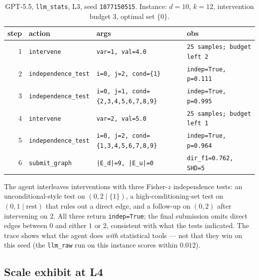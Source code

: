 \begin{table}[h]
\centering
\small
\begin{tabular}{@{}r l l l@{}}
\toprule
step & action & args & obs \\
\midrule
1 & \texttt{intervene}          & \texttt{var=1, val=4.0}                       & \texttt{25 samples; budget left 2} \\
2 & \texttt{independence\_test} & \texttt{i=0, j=2, cond=\{1\}}                  & \texttt{indep=True, p=0.111} \\
3 & \texttt{independence\_test} & \texttt{i=0, j=1, cond=\{2,3,4,5,6,7,8,9\}}    & \texttt{indep=True, p=0.995} \\
4 & \texttt{intervene}          & \texttt{var=2, val=5.0}                       & \texttt{25 samples; budget left 1} \\
5 & \texttt{independence\_test} & \texttt{i=0, j=2, cond=\{1,3,4,5,6,7,8,9\}}    & \texttt{indep=True, p=0.964} \\
6 & \texttt{submit\_graph}       & \texttt{|E\_d|=9, |E\_u|=0}                  & \texttt{dir\_f1=0.762, SHD=5} \\
\bottomrule
\end{tabular}
\caption{GPT-5.5, \texttt{llm\_stats}, L3, seed \texttt{1877150515}. Instance: $d = 10$, $k = 12$, intervention budget $3$, optimal set $\{0\}$.}
\label{tab:trace4}
\end{table}

The agent interleaves interventions with three Fisher-$z$ independence tests: an unconditional-style test on $(0, 2 \mid \{1\})$, a high-conditioning-set test on $(0, 1 \mid \text{rest})$ that rules out a direct edge, and a follow-up on $(0, 2)$ after intervening on $2$. All three return \texttt{indep=True}; the final submission omits direct edges between $0$ and either $1$ or $2$, consistent with what the tests indicated. The trace shows what the agent does \emph{with} statistical tools — not that they win on this seed (the \texttt{llm\_raw} run on this instance scores within $0.012$).

\subsection{Scale exhibit at L4}
\label{app:traces:scale}

